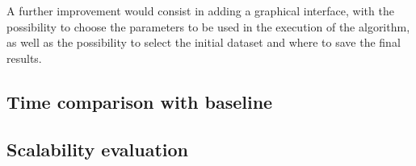 A further improvement would consist in adding a graphical interface, with the possibility to choose the parameters to be used in the execution of the algorithm, as well as the possibility to select the initial dataset and where to save the final results.

\subsection*{Time comparison with baseline}


\subsection*{Scalability evaluation}